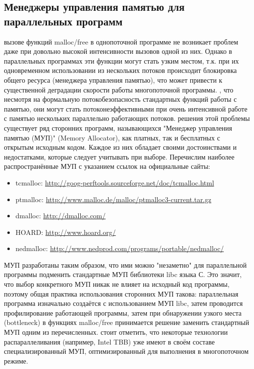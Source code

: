 { %
	\subsection{Менеджеры управления памятью для параллельных программ}
	\Large{} вызове функций malloc/free в однопоточной программе не возникает проблем даже при довольно высокой интенсивности вызовов одной из них. Однако в параллельных программах эти функции могут стать узким местом, т.к. при их одновременном использовании из нескольких потоков происходит блокировка общего ресурса (менеджера управления памятью), что может привести к существенной деградации скорости работы многопоточной программы.
	, что несмотря на формальную потокобезопасность стандартных функций работы с памятью, они могут стать потоконеэффективными при очень интенсивной работе с памятью нескольких параллельно работающих потоков.
	 решения этой проблемы существует ряд сторонних программ, называющихся "Менеджер управления памятью (МУП)" (Memory Allocator), как платных, так и бесплатных с открытым исходным кодом. Каждое из них обладает своими достоинствами и недостатками, которые следует учитывать при выборе. Перечислим наиболее распространённые МУП с указанием ссылок на официальные сайты:
	\begin{itemize}
		\sloppy
		\item tcmalloc: \url{http://goog-perftools.sourceforge.net/doc/tcmalloc.html}
		\item ptmalloc: \url{http://www.malloc.de/malloc/ptmalloc3-current.tar.gz}
		\item dmalloc: \url{http://dmalloc.com/}
		\item HOARD: \url{http://www.hoard.org/}
		\item nedmalloc: \url{http://www.nedprod.com/programs/portable/nedmalloc/}
	\end{itemize}
	 МУП разработаны таким образом, что ими можно "незаметно" для параллельной программы подменить стандартные МУП библиотеки libc языка С. Это значит, что выбор конкретного МУП никак не влияет на исходный код программы, поэтому общая практика использования сторонних МУП такова: параллельная программа изначально создаётся с использованием МУП libc, затем проводится профилирование работающей программы, затем при обнаружении узкого места (bottleneck) в функциях malloc/free принимается решение заменить стандартный МУП одним из перечисленных.
	 стоит отметить, что некоторые технологии распараллеливания (например, Intel TBB) уже имеют в своём составе специализированный МУП, оптимизированный для выполнения в многопоточном режиме.
	\par
}